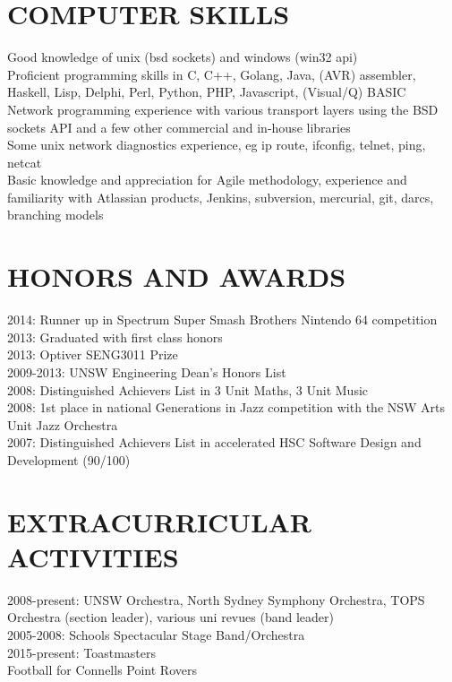\documentclass{res}
\begin{document}
\begin{resume}
\section{COMPUTER SKILLS}          
    Good knowledge of unix (bsd sockets) and windows (win32 api) \\
    Proficient programming skills in C, C++, Golang, Java, (AVR) assembler, Haskell, Lisp, Delphi, Perl, Python, PHP, Javascript, (Visual/Q) BASIC \\
    Network programming experience with various transport layers using the BSD sockets API and a few other commercial and in-house libraries \\
    Some unix network diagnostics experience, eg ip route, ifconfig, telnet, ping, netcat \\
    Basic knowledge and appreciation for Agile methodology, experience and familiarity with Atlassian products, Jenkins, subversion, mercurial, git, darcs, branching models
 
 
\section{HONORS AND AWARDS}          
    2014: Runner up in Spectrum Super Smash Brothers Nintendo 64 competition \\
    2013: Graduated with first class honors \\
    2013: Optiver SENG3011 Prize \\
    2009-2013: UNSW Engineering Dean's Honors List \\
    2008: Distinguished Achievers List in 3 Unit Maths, 3 Unit Music \\
    2008: 1st place in national Generations in Jazz competition with the NSW Arts Unit Jazz Orchestra \\
    2007: Distinguished Achievers List in accelerated HSC Software Design and Development (90/100)
 
\section{EXTRACURRICULAR ACTIVITIES}          
    2008-present: UNSW Orchestra, North Sydney Symphony Orchestra, TOPS Orchestra (section leader), various uni revues (band leader) \\
    2005-2008: Schools Spectacular Stage Band/Orchestra \\
    2015-present: Toastmasters \\
    Football for Connells Point Rovers
 
\end{resume}
\end{document}
